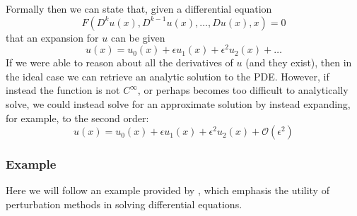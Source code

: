 \noindent
Formally then we can state that, given a differential equation
$$F(D^{k} u(x), D^{k-1}u(x), \dots, Du(x), x) = 0$$
that an expansion for $u$ can be given
$$u(x) = u_0(x) + \epsilon u_1(x) + \epsilon^2 u_2(x) + \dots$$
If we were able to reason about all the derivatives of $u$ (and they exist), then in the ideal case we 
can retrieve an analytic solution to the PDE. However, if instead the function is not $C^{\infty}$, or perhaps 
becomes too difficult to analytically solve, we could instead solve for an approximate solution by instead expanding, for 
example, to the second order:
$$u(x) = u_0(x) + \epsilon u_1(x) + \epsilon^2 u_2(x) + \mathcal{O}(\epsilon^2)$$

\subsubsection{Example}
Here we will follow an example provided by \cite{perturbation-example}, which emphasis the utility of perturbation methods in solving 
differential equations. 

